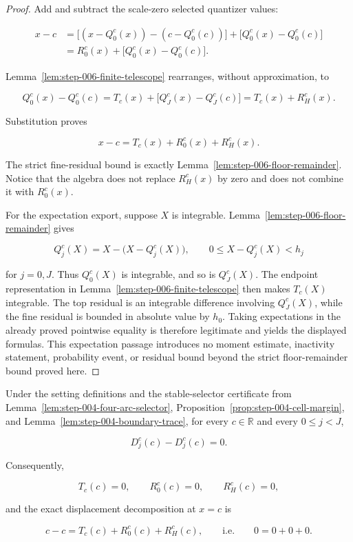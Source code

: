 \begin{proof}
Add and subtract the scale-zero selected quantizer values:

\[
\begin{aligned}
x-c
&=\bigl[(x-Q_0^c(x))-(c-Q_0^c(c))\bigr]
  +\bigl[Q_0^c(x)-Q_0^c(c)\bigr]\\
&=R_0^c(x)+\bigl[Q_0^c(x)-Q_0^c(c)\bigr].
\end{aligned}
\]

Lemma~\ref{lem:step-006-finite-telescope} rearranges, without approximation, to

\[
Q_0^c(x)-Q_0^c(c)
=T_c(x)+\bigl[Q_J^c(x)-Q_J^c(c)\bigr]
=T_c(x)+R_H^c(x).
\]

Substitution proves

\[
x-c=T_c(x)+R_0^c(x)+R_H^c(x).
\]

The strict fine-residual bound is exactly Lemma~\ref{lem:step-006-floor-remainder}. Notice that the algebra does not replace \(R_H^c(x)\) by zero and does not combine it with \(R_0^c(x)\).

For the expectation export, suppose \(X\) is integrable. Lemma~\ref{lem:step-006-floor-remainder} gives

\[
Q_j^c(X)=X-\bigl(X-Q_j^c(X)\bigr),
\qquad
0\leq X-Q_j^c(X)<h_j
\]

for \(j=0,J\). Thus \(Q_0^c(X)\) is integrable, and so is \(Q_J^c(X)\).
The endpoint representation in Lemma~\ref{lem:step-006-finite-telescope}
then makes \(T_c(X)\) integrable. The top residual is an integrable difference
involving \(Q_J^c(X)\), while the fine residual is bounded in absolute value by
\(h_0\). Taking expectations in the already proved pointwise equality is
therefore legitimate and yields the displayed formulas. This expectation
passage introduces no moment estimate, inactivity statement, probability event,
or residual bound beyond the strict floor-remainder bound proved here.
\end{proof}

\begin{lemma}\label{lem:step-006-zero-displacement}
Under the setting definitions and the stable-selector certificate from Lemma~\ref{lem:step-004-four-arc-selector}, Proposition~\ref{prop:step-004-cell-margin}, and Lemma~\ref{lem:step-004-boundary-trace}, for every \(c\in\mathbb R\) and every \(0\leq j<J\),

\[
D_j^c(c)-D_j^c(c)=0.
\]

Consequently,

\[
T_c(c)=0,
\qquad
R_0^c(c)=0,
\qquad
R_H^c(c)=0,
\]

and the exact displacement decomposition at \(x=c\) is

\[
c-c=T_c(c)+R_0^c(c)+R_H^c(c),
\qquad\text{i.e.}\qquad
0=0+0+0.
\]
\end{lemma}

